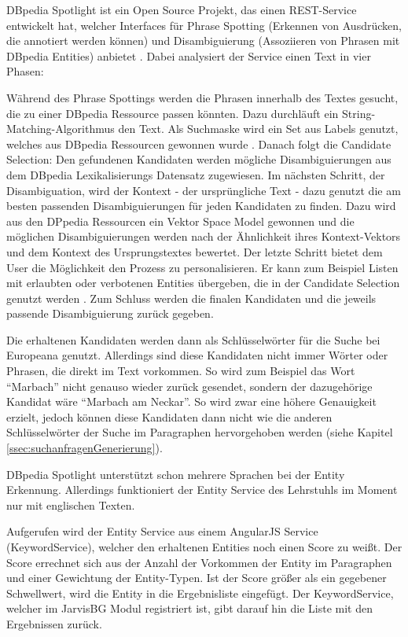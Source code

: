   DBpedia Spotlight ist ein Open Source Projekt, das einen REST-Service entwickelt hat, welcher Interfaces für Phrase Spotting (Erkennen von Ausdrücken, die annotiert werden können) und Disambiguierung (Assoziieren von Phrasen mit DBpedia Entities) anbietet \cite{daiber2013improving}. Dabei analysiert der Service einen Text in vier Phasen:

  Während des Phrase Spottings werden die Phrasen innerhalb des Textes gesucht, die zu einer DBpedia Ressource passen könnten. Dazu durchläuft ein String-Matching-Algorithmus den Text. Als Suchmaske wird ein Set aus Labels genutzt, welches aus DBpedia Ressourcen gewonnen wurde \cite{mendes2011dbpedia}. Danach folgt die Candidate Selection: Den gefundenen Kandidaten werden mögliche Disambiguierungen aus dem DBpedia Lexikalisierungs Datensatz zugewiesen. Im nächsten Schritt, der Disambiguation, wird der Kontext - der ursprüngliche Text - dazu genutzt die am besten passenden Disambiguierungen für jeden Kandidaten zu finden. Dazu wird aus den DPpedia Ressourcen ein Vektor Space Model gewonnen und die möglichen Disambiguierungen werden nach der Ähnlichkeit ihres Kontext-Vektors und dem Kontext des Ursprungstextes bewertet. Der letzte Schritt bietet dem User die Möglichkeit den Prozess zu personalisieren. Er kann zum Beispiel Listen mit erlaubten oder verbotenen Entities übergeben, die in der Candidate Selection genutzt werden \cite{mendes2011dbpedia}. Zum Schluss werden die finalen Kandidaten und die jeweils passende Disambiguierung zurück gegeben. 

  Die erhaltenen Kandidaten werden dann als Schlüsselwörter für die Suche bei Europeana genutzt. Allerdings sind diese Kandidaten nicht immer Wörter oder Phrasen, die direkt im Text vorkommen. So wird zum Beispiel das Wort ``Marbach'' nicht genauso wieder zurück gesendet, sondern der dazugehörige Kandidat wäre ``Marbach am Neckar''. So wird zwar eine höhere Genauigkeit erzielt, jedoch können diese Kandidaten dann nicht wie die anderen Schlüsselwörter der Suche im Paragraphen hervorgehoben werden (siehe Kapitel \ref{ssec:suchanfragenGenerierung}).
 
  DBpedia Spotlight unterstützt schon mehrere Sprachen bei der Entity Erkennung. Allerdings funktioniert der Entity Service des Lehrstuhls im Moment nur mit englischen Texten.

  Aufgerufen wird der Entity Service aus einem AngularJS Service (KeywordService), welcher den erhaltenen Entities noch einen Score zu weißt. Der Score errechnet sich aus der Anzahl der Vorkommen der Entity im Paragraphen und einer Gewichtung der Entity-Typen. Ist der Score größer als ein gegebener Schwellwert, wird die Entity in die Ergebnisliste eingefügt. Der KeywordService, welcher im JarvisBG Modul registriert ist, gibt darauf hin die Liste mit den Ergebnissen zurück.

